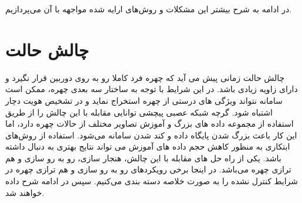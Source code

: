 \noindent
در ادامه به شرح بیشتر این مشکلات و روش‌های ارایه شده مواجهه با آن می‌پردازیم.

\section{چالش حالت}
چالش حالت زمانی پیش می آید که چهره فرد کاملا رو به روی دوربین قرار نگیرد و دارای زاویه زیادی باشد. در این شرایط با توجه به ساختار سه بعدی چهره، ممکن است سامانه نتواند ویژگی های درستی از چهره استخراج نماید و در تشخیص هویت دچار اشتباه شود. گرچه شبکه عصبی پیچشی توانایی مقابله با این چالش را از طریق استفاده از مجموعه داده های بزرگ و آموزش تصاویر مختلف از حالات چهره دارد، اما این کار باعث بزرگ شدن پایگاه داده و کند شدن سامانه می‌شود. استفاده از روش‌های ابتکاری  به منظور کاهش حجم داده های آموزش می تواند نتایج بهتری به دنبال داشته باشد. یکی از راه  حل های مقابله با این چالش، هنجار سازی، رو به رو سازی  و هم ترازی  چهره می‌باشد. در اینجا برخی رویکردهای رو به رو سازی و هم ترازی چهره در شرایط کنترل نشده را به صورت خلاصه دسته بندی می‌کنیم. سپس در ادامه شرح داده خواهند شد. 

